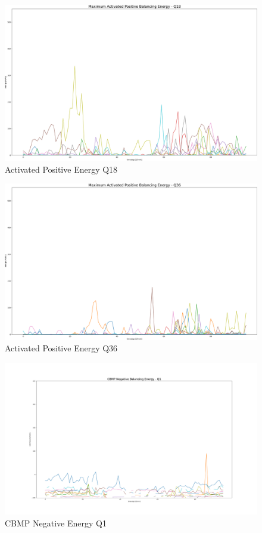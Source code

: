 \begin{figure}
	\includegraphics[width=1\linewidth]{pictures/results/Activated_posEnergy_Q18.png}
	\caption{Activated Positive Energy Q18}
	\label{fig:_posEnergy_Q18}
\end{figure}

\begin{figure}
	\includegraphics[width=1\linewidth]{pictures/results/Activated_posEnergy_Q36.png}
	\caption{Activated Positive Energy Q36}
	\label{fig:_posEnergy_Q36}
\end{figure}



\begin{figure}[H]
	\centering
	\includegraphics[width=1\linewidth]{pictures/results/CBMP_negBal_Q1.png}
	\caption{CBMP Negative Energy Q1}
	\label{fig:CBMP_negBal_Q1}
\end{figure}


